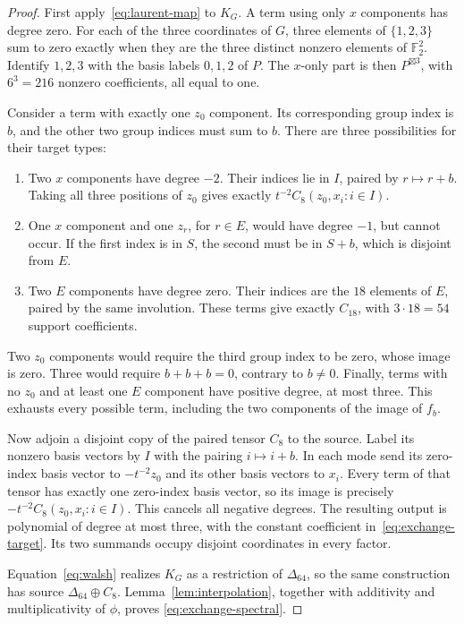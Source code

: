 \documentclass[10pt,a4paper]{article}
\theoremstyle{definition}
\theoremstyle{remark}
\numberwithin{equation}{section}
\newcommand{\F}{\mathbb F}
\begin{document}
\begin{proof}
First apply~\eqref{eq:laurent-map} to $K_G$. A term using only
$x$ components has degree zero. For each of the three coordinates
of $G$, three elements of $\{1,2,3\}$ sum to zero exactly when
they are the three distinct nonzero elements of $\F_2^2$.
Identify $1,2,3$ with the basis labels $0,1,2$ of $P$.
The $x$-only part is then $P^{\boxtimes3}$, with $6^3=216$
nonzero coefficients, all equal to one.

Consider a term with exactly one $z_0$ component. Its corresponding
group index is $b$, and the other two group indices must sum to $b$.
There are three possibilities for their target types:
\begin{enumerate}
\item Two $x$ components have degree $-2$. Their indices lie in
$I$, paired by $r\mapsto r+b$. Taking all three positions of $z_0$
gives exactly $t^{-2}C_8(z_0,x_i:i\in I)$.
\item One $x$ component and one $z_r$, for $r\in E$, would have
degree $-1$, but cannot occur. If the first index is in $S$, the
second must be in $S+b$, which is disjoint from $E$.
\item Two $E$ components have degree zero. Their indices are the
$18$ elements of $E$, paired by the same involution. These terms
give exactly $C_{18}$, with $3\cdot18=54$ support coefficients.
\end{enumerate}
Two $z_0$ components would require the third group index to be zero,
whose image is zero. Three would require $b+b+b=0$, contrary to
$b\ne0$. Finally, terms with no $z_0$ and at least one $E$ component
have positive degree, at most three. This exhausts every possible
term, including the two components of the image of $f_b$.

Now adjoin a disjoint copy of the paired tensor $C_8$ to the source.
Label its nonzero basis vectors by $I$ with the pairing $i\mapsto i+b$.
In each mode send its zero-index basis vector to $-t^{-2}z_0$ and its
other basis vectors to $x_i$. Every term of that tensor has exactly
one zero-index basis vector, so its image is precisely
$-t^{-2}C_8(z_0,x_i:i\in I)$. This cancels all negative degrees.
The resulting output is polynomial of degree at most three, with
the constant coefficient in~\eqref{eq:exchange-target}. Its two
summands occupy disjoint coordinates in every factor.

Equation~\eqref{eq:walsh} realizes $K_G$ as a restriction of
$\Delta_{64}$, so the same construction has source
$\Delta_{64}\oplus C_8$. Lemma~\ref{lem:interpolation}, together
with additivity and multiplicativity of $\phi$, proves
\eqref{eq:exchange-spectral}.
\end{proof}
\end{document}
